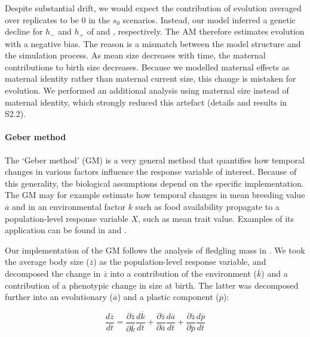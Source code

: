 Despite substantial drift, we would expect the contribution of evolution averaged over replicates to be 0 in the $s_0$ scenarios. Instead, our model inferred a genetic decline for $h_{-}$ and $h_+$  of  and , respectively. The AM therefore estimates evolution with a negative bias. The reason is a mismatch between the model structure and the simulation process. As mean size decreases with time, the maternal contributions to birth size decreases. Because we modelled maternal effects as maternal identity rather than maternal current size, this change is mistaken for evolution. We performed an additional analysis using maternal size instead of maternal identity, which strongly reduced this artefact (details and results in S2.2).

\paragraph{Geber method}
The `Geber method' (GM) \parencite{Hairston2005} is a very general method that quantifies how temporal changes in various factors influence the response variable of interest. Because of this generality, the biological assumptions depend on the specific implementation. The GM may for example estimate how temporal changes in mean breeding value $\overline{a}$ and in an environmental factor $k$ such as food availability propagate to a population-level response variable $X$, such as mean trait value. Examples of its application can be found in \cite{Ellner2011} and \cite{Becks2012}.

Our implementation of the GM follows the analysis of fledgling mass in \cite{Ellner2011}. We took the average body size ($\overline z$) as the population-level response variable, and decomposed the change in $\overline z$ into a contribution of the environment ($\overline k$) and a contribution of a phenotypic change in size at birth. The latter was decomposed further into an evolutionary ($\overline a$) and a plastic component ($\overline p$):

\begin{equation}
\frac{d \overline{z}}{dt} = \frac{\partial \overline{z}}{\partial \overline{k}} \frac{d\overline{k}}{dt} + \frac{\partial \overline{z}}{\partial \overline{a}}\frac{d \overline{a}}{dt} + \frac{\partial \overline{z}}{\partial \overline{p}}\frac{d\overline{p}}{dt} 
\end{equation}

